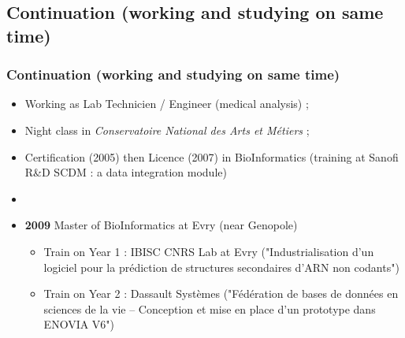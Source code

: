 \documentclass{beamer}
\begin{document}
\def\titleSubSectionCurriculumPartTwo{Continuation (working and studying on same time)}
\subsection{ \titleSubSectionCurriculumPartTwo }
\begin{frame}
	\frametitle{ \titleSubSectionCurriculumPartTwo }
	\begin{itemize}
		\item Working as Lab Technicien / Engineer (medical analysis) ; 
		\item Night class in \emph{Conservatoire National des Arts et M{\'e}tiers} ; 
		\item Certification (2005) then Licence (2007) in BioInformatics 
		(training at Sanofi R\&D SCDM : a data integration module)
		\item[]  
		\item \textbf{2009} Master of BioInformatics at Evry (near Genopole)
		\begin{itemize}
			\item Train on Year 1 : IBISC CNRS Lab at Evry ("Industrialisation d'un logiciel pour la pr{\'e}diction de structures secondaires d'ARN non codants")
			\item Train on Year 2 : Dassault Syst{\`e}mes ("F{\'e}d{\'e}ration de bases de donn{\'e}es en sciences de la vie -- Conception et mise en place d'un prototype dans ENOVIA V6")
		\end{itemize}
	\end{itemize}
\end{frame}
\end{document}
